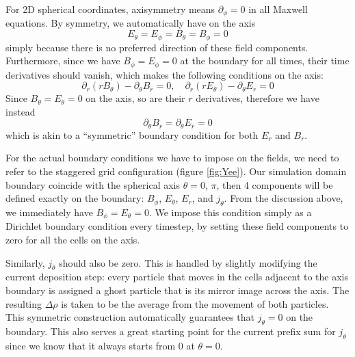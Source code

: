 For 2D spherical coordinates, axisymmetry means $\partial_{\phi} = 0$ in all
Maxwell equations. By symmetry, we automatically have on the axis
\begin{equation}
  E_{\theta} = E_{\phi} = B_{\theta} = B_{\phi} = 0
\end{equation}
simply because there is no preferred direction of these field components.
Furthermore, since we have $B_{\phi} = E_{\phi} = 0$ at the boundary for all
times, their time derivatives should vanish, which makes the following
conditions on the axis:
\begin{equation}
  \partial_r(rB_{\theta}) - \partial_{\theta}B_r = 0,\quad \partial_r(rE_{\theta}) - \partial_{\theta}E_{r} = 0
\end{equation}
Since $B_{\theta} = E_{\theta} = 0$ on the axis, so are their $r$
derivatives, therefore we have instead
\begin{equation}
  \partial_{\theta}B_r = \partial_{\theta}E_r = 0
\end{equation}
which is akin to a ``symmetric'' boundary condition for both $E_r$ and $B_r$.

For the actual boundary conditions we have to impose on the fields, we need to
refer to the staggered grid configuration (figure \ref{fig:Yee}). Our simulation
domain boundary coincide with the spherical axis $\theta = 0$, $\pi$, then 4
components will be defined exactly on the boundary: $B_{\phi}$, $E_{\theta}$,
$E_r$, and $j_{\theta}$. From the discussion above, we immediately have
$B_{\phi} = E_{\theta} = 0$. We impose this condition simply as a Dirichlet
boundary condition every timestep, by setting these field components to zero for
all the cells on the axis.

Similarly, $j_{\theta}$ should also be zero. This is handled by slightly
modifying the current deposition step: every particle that moves in the cells
adjacent to the axis boundary is assigned a ghost particle that is its mirror
image across the axis. The resulting $\Delta \rho$ is taken to be the average
from the movement of both particles. This symmetric construction automatically
guarantees that $j_{\theta} = 0$ on the boundary. This also serves a great
starting point for the current prefix sum for $j_{\theta}$ since we know that it
always starts from 0 at $\theta = 0$.

